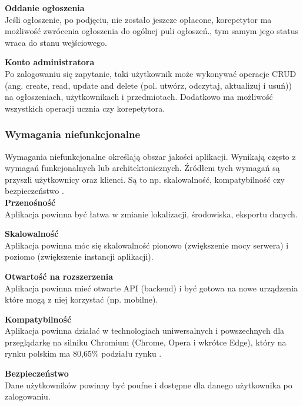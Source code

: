 \documentclass[12pt]{article}
\numberwithin{figure}{section}
\begin{document}
\begin{sloppypar}
\noindent
\textbf{Oddanie ogłoszenia}\\
\indent
Jeśli ogłoszenie, po podjęciu, nie zostało jeszcze opłacone, korepetytor ma możliwość zwrócenia ogłoszenia do ogólnej puli ogłoszeń., tym samym jego status wraca do stanu wejściowego. 

\noindent
\textbf{Konto administratora}\\
\indent
Po zalogowaniu się zapytanie, taki użytkownik może wykonywać operacje CRUD (ang. create, read, update and delete (pol. utwórz, odczytaj, aktualizuj i usuń)) na ogłoszeniach, użytkownikach i przedmiotach. Dodatkowo ma możliwość wszystkich operacji ucznia czy korepetytora.

\subsubsection{Wymagania niefunkcjonalne}

Wymagania niefunkcjonalne określają obszar jakości aplikacji. Wynikają często z wymagań funkcjonalnych lub architektonicznych. Źródłem tych wymagań są przyszli użytkownicy oraz klienci. Są to np. skalowalność, kompatybilność czy bezpieczeństwo \cite{niefunkcjonalne}.\\
\noindent
\textbf{Przenośność}\\
\indent
Aplikacja powinna być łatwa w zmianie lokalizacji, środowiska, eksportu danych.

\noindent
\textbf{Skalowalność}\\
\indent
Aplikacja powinna móc się skalowalność pionowo (zwiększenie mocy serwera) i poziomo (zwiększenie instancji aplikacji).

\noindent
\textbf{Otwartość na rozszerzenia}\\
\indent
Aplikacja powinna mieć otwarte API (backend) i być gotowa na nowe urządzenia które mogą z niej korzystać (np. mobilne).

\noindent
\textbf{Kompatybilność}\\
\indent
Aplikacja powinna działać w technologiach uniwersalnych i powszechnych dla przeglądarkę na silniku Chromium (Chrome, Opera i wkrótce Edge), który na rynku polskim ma 80,65\% podziału rynku \cite{chrome}.

\noindent
\textbf{Bezpieczeństwo}\\
\indent
Dane użytkowników powinny być poufne i dostępne dla danego użytkownika po zalogowaniu.


\end{sloppypar}
\end{document}
